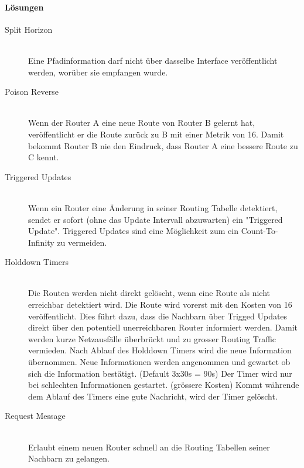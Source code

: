 \paragraph{Lösungen}
\begin{description} 
	\item[Split Horizon] \hfill \\
	Eine Pfadinformation darf nicht über dasselbe Interface veröffentlicht werden, worüber sie empfangen wurde.
	\item[Poison Reverse]\hfill \\
	Wenn der Router A eine neue Route von Router B gelernt hat, veröffentlicht er die Route zurück zu B mit einer Metrik von 16. Damit bekommt Router B nie den Eindruck, dass Router A eine bessere Route zu C kennt.	
	\item[Triggered Updates] \hfill \\
	Wenn ein Router eine Änderung in seiner Routing Tabelle detektiert, sendet er sofort (ohne das Update Intervall abzuwarten) ein "Triggered Update". Triggered Updates sind eine Möglichkeit zum ein Count-To-Infinity zu vermeiden.
	\item[Holddown Timers] \hfill \\
	Die Routen werden nicht direkt gelöscht, wenn eine Route als nicht erreichbar detektiert wird. Die Route wird vorerst mit den Kosten von 16 veröffentlicht. Dies führt dazu, dass die Nachbarn über Trigged Updates direkt über den potentiell unerreichbaren Router informiert werden. Damit werden kurze Netzausfälle überbrückt und zu grosser Routing Traffic vermieden. Nach Ablauf des Holddown Timers wird die neue Information übernommen. Neue Informationen werden angenommen und gewartet ob sich die Information bestätigt. (Default 3x30s = 90s) Der Timer wird nur bei schlechten Informationen gestartet. (grössere Kosten) Kommt währende dem Ablauf des Timers eine gute Nachricht, wird der Timer gelöscht.
	\item[Request Message] \hfill \\
	Erlaubt einem neuen Router schnell an die Routing Tabellen seiner Nachbarn zu gelangen.
\end{description}


